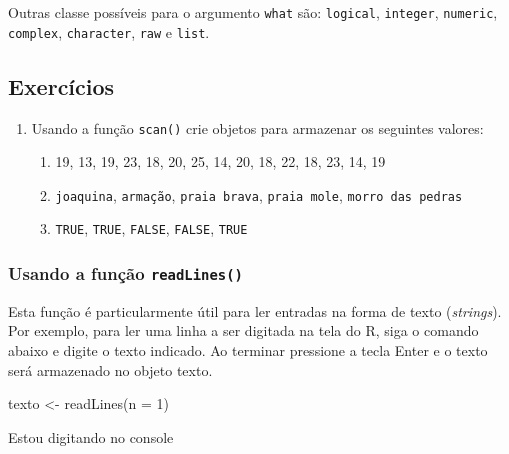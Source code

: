 \documentclass[
  10pt,
  a4paper]{book}
\newenvironment{Shaded}{\begin{snugshade}}{\end{snugshade}}
\newcommand{\AttributeTok}[1]{\textcolor[rgb]{0.77,0.63,0.00}{#1}}
\newcommand{\DecValTok}[1]{\textcolor[rgb]{0.00,0.00,0.81}{#1}}
\newcommand{\FunctionTok}[1]{\textcolor[rgb]{0.00,0.00,0.00}{#1}}
\newcommand{\NormalTok}[1]{#1}
\newcommand{\OtherTok}[1]{\textcolor[rgb]{0.56,0.35,0.01}{#1}}
\providecommand{\tightlist}{%
  \setlength{\itemsep}{0pt}\setlength{\parskip}{0pt}}
\begin{document}
Outras classe possíveis para o argumento \texttt{what} são: \texttt{logical},
\texttt{integer}, \texttt{numeric}, \texttt{complex}, \texttt{character}, \texttt{raw} e \texttt{list}.

\hypertarget{exercuxedcios-9}{%
\subsection*{Exercícios}\label{exercuxedcios-9}}


\begin{enumerate}
\def\labelenumi{\arabic{enumi}.}
\tightlist
\item
  Usando a função \texttt{scan()} crie objetos para armazenar os seguintes
  valores:

  \begin{enumerate}
  \def\labelenumii{\alph{enumii}.}
  \tightlist
  \item
    19, 13, 19, 23, 18, 20, 25, 14, 20, 18, 22, 18, 23, 14, 19
  \item
    \texttt{joaquina}, \texttt{armação}, \texttt{praia\ brava}, \texttt{praia\ mole}, \texttt{morro\ das\ pedras}
  \item
    \texttt{TRUE}, \texttt{TRUE}, \texttt{FALSE}, \texttt{FALSE}, \texttt{TRUE}
  \end{enumerate}
\end{enumerate}

\hypertarget{usando-a-funuxe7uxe3o-readlines}{%
\subsubsection{\texorpdfstring{Usando a função \texttt{readLines()}}{Usando a função readLines()}}\label{usando-a-funuxe7uxe3o-readlines}}

Esta função é particularmente útil para ler entradas na forma de texto
(\emph{strings}). Por exemplo, para ler uma linha a ser digitada na tela do
R, siga o comando abaixo e digite o texto indicado. Ao terminar pressione
a tecla Enter e o texto será armazenado no objeto texto.

\begin{Shaded}
\begin{Highlighting}[]
\NormalTok{texto }\OtherTok{\textless{}{-}} \FunctionTok{readLines}\NormalTok{(}\AttributeTok{n =} \DecValTok{1}\NormalTok{)}
\end{Highlighting}
\end{Shaded}

\begin{Shaded}
\begin{Highlighting}[]
\NormalTok{Estou digitando no console}
\end{Highlighting}
\end{Shaded}
\end{document}
